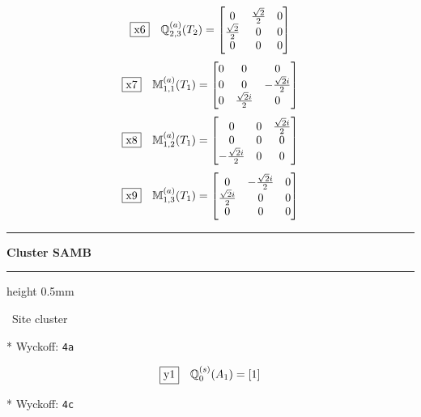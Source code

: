 \documentclass[fleqn,10pt,landscape]{jsarticle}
\begin{document}
\begin{dmath*}
\fbox{x6}\quad \mathbb{Q}_{2,3}^{(a)}(T_{2})=\begin{bmatrix} 0 & \frac{\sqrt{2}}{2} & 0 \\ \frac{\sqrt{2}}{2} & 0 & 0 \\ 0 & 0 & 0 \end{bmatrix}
\end{dmath*}
\begin{dmath*}
\fbox{x7}\quad \mathbb{M}_{1,1}^{(a)}(T_{1})=\begin{bmatrix} 0 & 0 & 0 \\ 0 & 0 & - \frac{\sqrt{2} i}{2} \\ 0 & \frac{\sqrt{2} i}{2} & 0 \end{bmatrix}
\end{dmath*}
\begin{dmath*}
\fbox{x8}\quad \mathbb{M}_{1,2}^{(a)}(T_{1})=\begin{bmatrix} 0 & 0 & \frac{\sqrt{2} i}{2} \\ 0 & 0 & 0 \\ - \frac{\sqrt{2} i}{2} & 0 & 0 \end{bmatrix}
\end{dmath*}
\begin{dmath*}
\fbox{x9}\quad \mathbb{M}_{1,3}^{(a)}(T_{1})=\begin{bmatrix} 0 & - \frac{\sqrt{2} i}{2} & 0 \\ \frac{\sqrt{2} i}{2} & 0 & 0 \\ 0 & 0 & 0 \end{bmatrix}
\end{dmath*}
\vspace{5mm}
\noindent \rule[0.5mm]{5mm}{0.5mm}\hspace{3mm}\textbf{Cluster SAMB}\hspace{3mm}\leaders\hrule height 0.5mm\hfill\kern0pt
\vspace{3mm}

\noindent\textbullet\, Site cluster

\vspace{5mm}

\noindent ** Wyckoff: \texttt{4a}

\begin{dmath*}
\fbox{y1}\quad \mathbb{Q}_{0}^{(s)}(A_{1})=\left[ 1 \right]
\end{dmath*}
\vspace{5mm}

\noindent ** Wyckoff: \texttt{4c}
\end{document}
